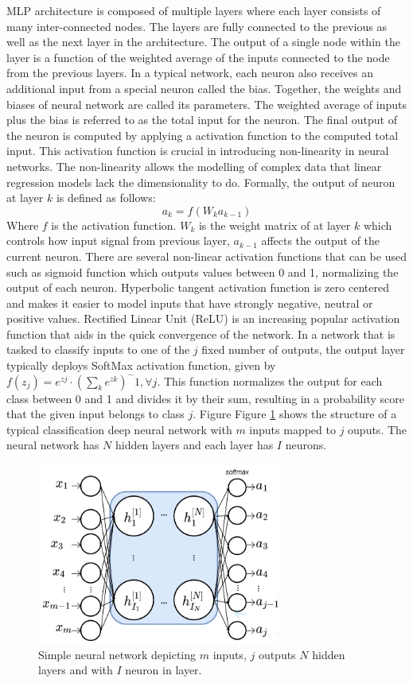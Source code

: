 \documentclass[conference]{IEEEtran}
\begin{document}
MLP architecture is composed of multiple layers where each layer consists of many inter-connected nodes. The layers are fully connected to the previous as well as the next layer in the architecture. The output of a single node within the layer is a function of the weighted average of the inputs connected to the node from the previous layers. In a typical network, each neuron also receives an additional input from a special neuron called the bias.  Together, the weights and biases of neural network are called its parameters. The weighted average of inputs plus the bias is referred to as the total input for the neuron. The final output of the neuron is computed by applying a activation function to the computed total input. This activation function is crucial in introducing non-linearity in neural networks. The non-linearity allows the modelling of complex data that linear regression models lack the dimensionality to do.
Formally, the output of neuron at layer $k$ is defined as follows:
$$a_k=f(W_k a_{k-1})$$
Where $f$ is the activation function.  $W_k$ is the weight matrix of at layer $k$ which controls how input signal from previous layer, $a_{k-1}$ affects the output of the current neuron. 
There are several non-linear activation functions that can be used such as sigmoid function which outputs values between 0 and 1, normalizing the output of each neuron. Hyperbolic tangent activation function is zero centered and makes it easier to model inputs that have strongly negative, neutral or positive values. Rectified Linear Unit (ReLU) is an increasing popular activation function that aids in the quick convergence of the network. In a network that is tasked to classify inputs to one of the $j$ fixed number of outputs, the output layer typically deploys SoftMax activation function, given by 
$f(z_j) = e^{zj}\cdot (\sum_ke^{zk})^-1, \forall j$.
This function normalizes the output for each class between 0 and 1 and divides it by their sum, resulting in a probability score that the given input belongs to class $j$. 
Figure Figure \ref{fig:SimplNN} shows the structure of a typical classification deep neural network with $m$ inputs mapped to $j$ ouputs. The neural network has $N$ hidden layers and each layer has $I$ neurons.
\begin{figure}[!h]
\includegraphics[width=8cm, keepaspectratio]{SimpleNN}
\caption{Simple neural network depicting $m$ inputs, $j$ outputs  $N$  hidden layers and with $I$ neuron in layer.}
\label{fig:SimplNN}

\end{figure}
\end{document}

